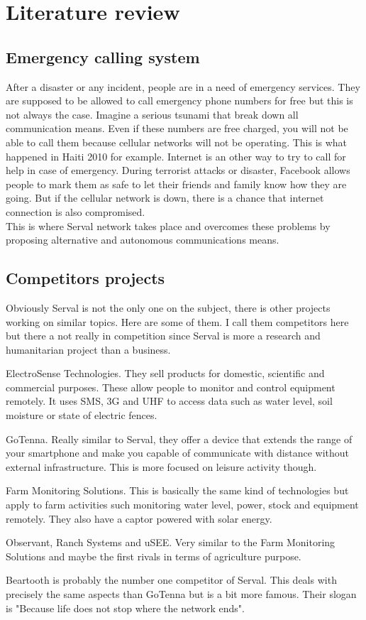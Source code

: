 \chapter{Literature review}

\section{Emergency calling system}
After a disaster or any incident, people are in a need of emergency services. They are supposed to be allowed to call emergency phone numbers for free but this is not always the case. Imagine a serious tsunami that break down all communication means. Even if these numbers are free charged, you will not be able to call them because cellular networks will not be operating. This is what happened in Haiti 2010 for example. 
Internet is an other way to try to call for help in case of emergency. During terrorist attacks or disaster, Facebook allows people to mark them as safe to let their friends and family know how they are going. But if the cellular network is down, there is a chance that internet connection is also compromised.\\
This is where Serval network takes place and overcomes these problems by proposing alternative and autonomous communications means.  

\section{Competitors projects}

Obviously Serval is not the only one on the subject, there is other projects working on similar topics. Here are some of them. I call them competitors here but there a not really in competition since Serval is more a research and humanitarian project than a business. 
\par
ElectroSense Technologies. They sell products for domestic, scientific and commercial purposes. These allow people to monitor and control equipment remotely. It uses SMS, 3G and UHF to access data such as water level, soil moisture or state of electric fences. 
\par
GoTenna. Really similar to Serval, they offer a device that extends the range of your smartphone and make you capable of communicate with distance without external infrastructure. This is more focused on leisure activity though.
\par
Farm Monitoring Solutions. This is basically the same kind of technologies but apply to farm activities such monitoring water level, power, stock and equipment remotely. They also have a captor powered with solar energy. 
\par 
Observant, Ranch Systems and uSEE. Very similar to the Farm Monitoring Solutions and maybe the first rivals in terms of agriculture purpose.
\par
Beartooth is probably the number one competitor of Serval. This deals with precisely the same aspects than GoTenna but is a bit more famous. Their slogan is "Because life does not stop where the network ends". 

